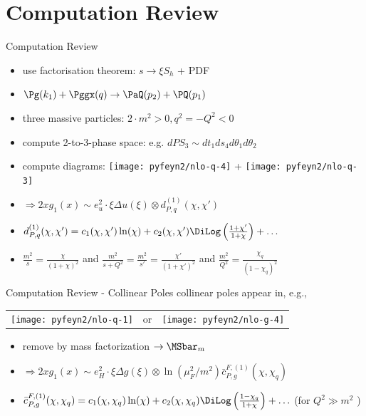 \section{Computation Review}
\begin{frame}{Computation Review}
\begin{itemize}
\item use factorisation theorem: $s\to \xi S_h$ + PDF
\item $\Pg(k_1) + \Pggx(q) \to \PaQ(p_2) + \PQ(p_1)$
\item three massive particles: $2\cdot m^2>0,q^2=-Q^2<0$
\item compute 2-to-3-phase space: e.g. $dPS_3 \sim dt_1ds_4d\theta_1d\theta_2$
\item compute diagrams: \texttt{[image: pyfeyn2/nlo-q-4]} + \texttt{[image: pyfeyn2/nlo-q-3]}
\item $\Rightarrow 2xg_1(x) \sim e_u^2\cdot \xi\Delta u(\xi) \otimes d_{P,q}^{(1)}(\chi,\chi')$
\item $d_{P,q}^{(1)}(\chi,\chi') = c_1(\chi,\chi')\ln(\chi) + c_2(\chi,\chi')\DiLog\left(\frac{1+\chi'}{1+\chi}\right)+\ldots$ \checkmark
\item $\frac{m^2}{s} = \frac{\chi}{(1+\chi)^2}$ and $\frac{m^2}{s+Q^2} = \frac{m^2}{s'} = \frac{\chi'}{(1+\chi')^2}$ and $\frac{m^2}{Q^2} = \frac{\chi_q}{(1-\chi_q)^2}$
\end{itemize}
\end{frame}


\begin{frame}{Computation Review - Collinear Poles}
collinear poles appear in, e.g.,
\begin{center}
\begin{tabular}{wnw}
\texttt{[image: pyfeyn2/nlo-q-1]}
&or
&\texttt{[image: pyfeyn2/nlo-g-4]}
\end{tabular}
\end{center}

\begin{itemize}
\item remove by mass factorization $\to \MSbar_m$
\item $\Rightarrow 2xg_1(x) \sim e_H^2\cdot \xi\Delta g(\xi) \otimes \ln(\mu_F^2/m^2) \bar c_{P,g}^{F,(1)}(\chi,\chi_q)$
\item $\bar c_{P,g}^{F,(1)}(\chi,\chi_q) = c_1(\chi,\chi_q)\ln(\chi) + c_2(\chi,\chi_q)\DiLog\left(\frac{1-\chi_q}{1+\chi}\right) + \ldots$ (\checkmark for $Q^2\gg m^2$ )
\end{itemize}
\end{frame}

